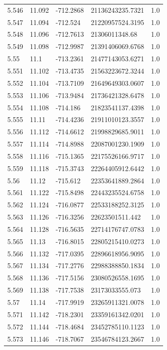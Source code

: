 \begin{tabular}{lllll}
5.546 & 11.092 & -712.2868 & 21136243235.7321 & 1.0 \\
5.547 & 11.094 & -712.524 & 21220957524.3195 & 1.0 \\
5.548 & 11.096 & -712.7613 & 21306011348.68 & 1.0 \\
5.549 & 11.098 & -712.9987 & 21391406069.6768 & 1.0 \\
5.55 & 11.1 & -713.2361 & 21477143053.6271 & 1.0 \\
5.551 & 11.102 & -713.4735 & 21563223672.3244 & 1.0 \\
5.552 & 11.104 & -713.7109 & 21649649303.0607 & 1.0 \\
5.553 & 11.106 & -713.9484 & 21736421328.6478 & 1.0 \\
5.554 & 11.108 & -714.186 & 21823541137.4398 & 1.0 \\
5.555 & 11.11 & -714.4236 & 21911010123.3557 & 1.0 \\
5.556 & 11.112 & -714.6612 & 21998829685.9011 & 1.0 \\
5.557 & 11.114 & -714.8988 & 22087001230.1909 & 1.0 \\
5.558 & 11.116 & -715.1365 & 22175526166.9717 & 1.0 \\
5.559 & 11.118 & -715.3743 & 22264405912.6442 & 1.0 \\
5.56 & 11.12 & -715.612 & 22353641889.2864 & 1.0 \\
5.561 & 11.122 & -715.8498 & 22443235524.6758 & 1.0 \\
5.562 & 11.124 & -716.0877 & 22533188252.3125 & 1.0 \\
5.563 & 11.126 & -716.3256 & 22623501511.442 & 1.0 \\
5.564 & 11.128 & -716.5635 & 22714176747.0783 & 1.0 \\
5.565 & 11.13 & -716.8015 & 22805215410.0273 & 1.0 \\
5.566 & 11.132 & -717.0395 & 22896618956.9095 & 1.0 \\
5.567 & 11.134 & -717.2776 & 22988388850.1834 & 1.0 \\
5.568 & 11.136 & -717.5156 & 23080526558.1695 & 1.0 \\
5.569 & 11.138 & -717.7538 & 23173033555.073 & 1.0 \\
5.57 & 11.14 & -717.9919 & 23265911321.0078 & 1.0 \\
5.571 & 11.142 & -718.2301 & 23359161342.0201 & 1.0 \\
5.572 & 11.144 & -718.4684 & 23452785110.1123 & 1.0 \\
5.573 & 11.146 & -718.7067 & 23546784123.2667 & 1.0 \\

\end{tabular}
